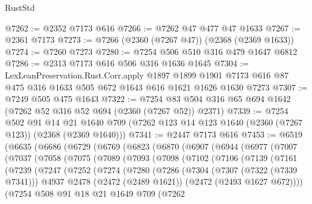 \begin{lexlean}{RustStd}
\begin{coremodule}
@7262 := @2352 @7173 @616
@7266 := @7262 @47 @477 @47 @1633
@7267 := @2361 @7173
@7273 := @7266 (@2360 (@7267 @47)) (@2368 (@2369 @1633))
@7274 := @7260 @7273
@7280 := @7254 @506 @510 @316 @479 @1647 @6812
@7286 := @2313 @7173 @616 @506 @316 @1636 @1645
@7304 := LexLeanPreservation.Rust.Corr.apply
    @1897
    @1899
    @1901
    @7173
    @616
    @87
    @475
    @316
    @1633
    @505
    @672
    @1643
    @616
    @1621
    @1626
    @1630
    @7273
@7307 := @7249 @505 @475 @1643
@7322 := @7254 @83 @504 @316 @65 @694 @1642 (@7262 @52 @316 @52 @694 (@2360 (@7267 @52)) @2371)
@7339 := @7254
    @502
    @91
    @14
    @21
    @1640
    @709
    (@7262 @123 @14 @123 @1640 (@2360 (@7267 @123)) (@2368 (@2369 @1640)))
@7341 := @2447 @7173 @616
@7453 := @6519
    (@6635
      (@6686
        (@6729
          (@6769
            (@6823
              (@6870
                (@6907
                  (@6944
                    (@6977
                      (@7007
                        (@7037
                          (@7058
                            (@7075
                              (@7089
                                (@7093
                                  (@7098
                                    (@7102
                                      (@7106
                                        (@7139
                                          (@7161
                                            (@7239
                                              (@7247
                                                (@7252
                                                  (@7274
                                                    (@7280
                                                      (@7286
                                                        (@7304
                                                          (@7307 (@7322 (@7339 @7341)))
                                                          @4937
                                                          @2478
                                                          (@2472 (@2489 @1621))
                                                          (@2472 (@2493 @1627 @672))))
                                                      (@7254
                                                        @508
                                                        @91
                                                        @18
                                                        @21
                                                        @1649
                                                        @709
                                                        (@7262

\end{coremodule}
\end{lexlean}
